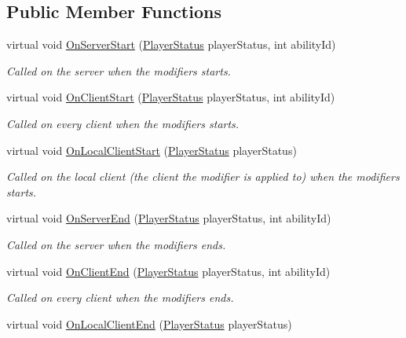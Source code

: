 \subsection*{Public Member Functions}
\begin{DoxyCompactItemize}
\item 
virtual void \hyperlink{class_modifier_ae54219588440fc4e2edfdb59c283c9b2}{On\+Server\+Start} (\hyperlink{class_player_status}{Player\+Status} player\+Status, int ability\+Id)
\begin{DoxyCompactList}\small\item\em Called on the server when the modifiers starts. \end{DoxyCompactList}\item 
virtual void \hyperlink{class_modifier_a90f173bd4674843a683769f46520273b}{On\+Client\+Start} (\hyperlink{class_player_status}{Player\+Status} player\+Status, int ability\+Id)
\begin{DoxyCompactList}\small\item\em Called on every client when the modifiers starts. \end{DoxyCompactList}\item 
virtual void \hyperlink{class_modifier_a5cce7ec6a5a595265a6bf5a6f7e40eb9}{On\+Local\+Client\+Start} (\hyperlink{class_player_status}{Player\+Status} player\+Status)
\begin{DoxyCompactList}\small\item\em Called on the local client (the client the modifier is applied to) when the modifiers starts. \end{DoxyCompactList}\item 
virtual void \hyperlink{class_modifier_ac14e32bd10e59e29c63c01cc52db7ace}{On\+Server\+End} (\hyperlink{class_player_status}{Player\+Status} player\+Status, int ability\+Id)
\begin{DoxyCompactList}\small\item\em Called on the server when the modifiers ends. \end{DoxyCompactList}\item 
virtual void \hyperlink{class_modifier_af9a32f8313b83253dac318eed1ebd7ac}{On\+Client\+End} (\hyperlink{class_player_status}{Player\+Status} player\+Status, int ability\+Id)
\begin{DoxyCompactList}\small\item\em Called on every client when the modifiers ends. \end{DoxyCompactList}\item 
virtual void \hyperlink{class_modifier_a1ea2aa04b05628c1965570396e390281}{On\+Local\+Client\+End} (\hyperlink{class_player_status}{Player\+Status} player\+Status)

\end{DoxyCompactItemize}
